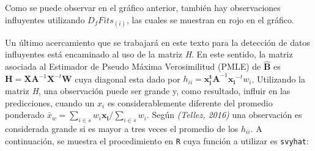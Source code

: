 \documentclass[
  12pt,
]{book}
\newenvironment{Shaded}{\begin{snugshade}}{\end{snugshade}}
\newcommand{\AttributeTok}[1]{\textcolor[rgb]{0.13,0.29,0.53}{#1}}
\newcommand{\DecValTok}[1]{\textcolor[rgb]{0.00,0.00,0.81}{#1}}
\newcommand{\FunctionTok}[1]{\textcolor[rgb]{0.13,0.29,0.53}{\textbf{#1}}}
\newcommand{\NormalTok}[1]{#1}
\newcommand{\OtherTok}[1]{\textcolor[rgb]{0.56,0.35,0.01}{#1}}
\newcommand{\SpecialCharTok}[1]{\textcolor[rgb]{0.81,0.36,0.00}{\textbf{#1}}}
\newcommand{\StringTok}[1]{\textcolor[rgb]{0.31,0.60,0.02}{#1}}
\begin{document}
\begin{Shaded}
\end{Shaded}

Como se puede observar en el gráfico anterior, también hay observaciones influyentes utilizando \(D_{f}Fits_{\left(i\right)}\), las cuales se muestran en rojo en el gráfico.

Un último acercamiento que se trabajará en este texto para la detección de datos influyentes está encaminado al uso de la matriz \emph{H}. En este sentido, la matriz asociada al Estimador de Pseudo Máxima Verosimilitud (PMLE) de \(\hat{\boldsymbol{B}}\) es \(\boldsymbol{H}=\boldsymbol{XA}^{-1}\boldsymbol{X}^{-t}\boldsymbol{W}\) cuya diagonal esta dado por \(h_{ii} = \boldsymbol{x_{i}^tA}^{-1}\boldsymbol{x_{i}}^{-t}w_{i}\). Utilizando la matriz \emph{H}, una observación puede ser grande y, como resultado, influir en las predicciones, cuando un \(x_i\) es considerablemente diferente del promedio ponderado \(\bar{x}_w=\sum_{i\in s}w_{i}\boldsymbol{x_{i}}\big/\sum_{i\in s}w_i\). Según \emph{(Tellez, 2016)} una observación es considerada grande si es mayor a tres veces el promedio de los \(h_{ii}\). A continuación, se muestra el procedimiento en \texttt{R} cuya función a utilizar es \texttt{svyhat}:
\end{document}
